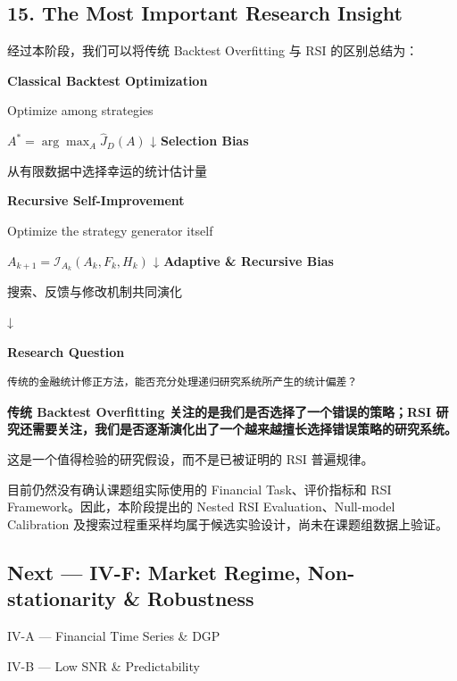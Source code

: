 \hypertarget{part-4-71-0001-the-most-important-research-insight}{%
\subsection{15. The Most Important Research Insight}\label{part-4-71-0001-the-most-important-research-insight}}

经过本阶段，我们可以将传统 Backtest Overfitting 与 RSI 的区别总结为：

\textbf{Classical Backtest Optimization}

Optimize among strategies

\(A^*=\arg\max_A\widehat J_D(A)\) ↓ \textbf{Selection Bias}

从有限数据中选择幸运的统计估计量

\textbf{Recursive Self-Improvement}

Optimize the strategy generator itself

\(A_{k+1}=\mathcal I_{A_k}(A_k,F_k,H_k)\) ↓ \textbf{Adaptive \& Recursive Bias}

搜索、反馈与修改机制共同演化

↓

\textbf{Research Question}

\begin{verbatim}
传统的金融统计修正方法，能否充分处理递归研究系统所产生的统计偏差？
\end{verbatim}

\textbf{传统 Backtest Overfitting 关注的是我们是否选择了一个错误的策略；RSI 研究还需要关注，我们是否逐渐演化出了一个越来越擅长选择错误策略的研究系统。}

这是一个值得检验的研究假设，而不是已被证明的 RSI 普遍规律。

目前仍然没有确认课题组实际使用的 Financial Task、评价指标和 RSI Framework。因此，本阶段提出的 Nested RSI Evaluation、Null-model Calibration 及搜索过程重采样均属于候选实验设计，尚未在课题组数据上验证。

\hypertarget{part-4-71-0001-next-iv-f-market-regime-non-stationarity-robustness}{%
\subsection{Next --- IV-F: Market Regime, Non-stationarity \& Robustness}\label{part-4-71-0001-next-iv-f-market-regime-non-stationarity-robustness}}

IV-A --- Financial Time Series \& DGP

IV-B --- Low SNR \& Predictability

